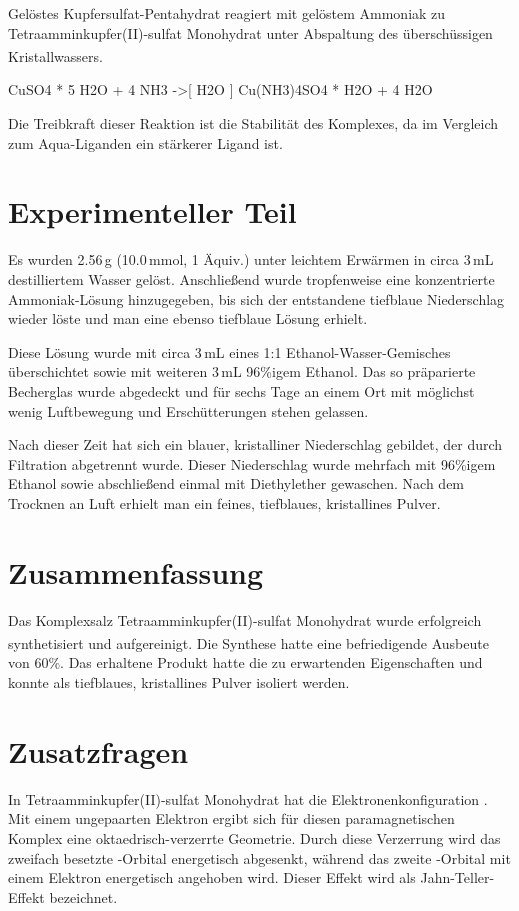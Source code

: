 \documentclass[12pt,a4paper]{scrartcl}
\begin{document}
Gelöstes Kupfersulfat-Pentahydrat  reagiert mit gelöstem Ammoniak  zu
Tetra\-ammin\-kupfer(II)-sulfat Monohydrat unter Abspaltung des überschüssigen Kris\-tall\-wassers.\textsuperscript{\cite{brauer1965handbook}\cite{J/B:2022:tetkupf}}
\begin{reaction}
  CuSO4 * 5 H2O + 4 NH3 ->[ H2O ] \lbrack{}Cu(NH3)4\rbrack{}SO4 * H2O + 4 H2O
\end{reaction}

Die Treibkraft dieser Reaktion ist die Stabilität des Komplexes, da  im Vergleich zum Aqua-Liganden ein
stärkerer Ligand ist.

\section{Experimenteller Teil} %
Es wurden 2.56\,g  (10.0\,mmol, 1 Äquiv.) unter leichtem Erwärmen in circa 3\,mL destilliertem Wasser
gelöst. Anschließend wurde tropfenweise eine konzentrierte Ammoniak-Lösung hinzugegeben, bis sich der entstandene
tiefblaue Niederschlag wieder löste und man eine ebenso tiefblaue Lösung erhielt.

Diese Lösung wurde mit circa 3\,mL eines 1:1 Ethanol-Wasser-Gemisches überschichtet sowie mit weiteren 3\,mL 96\%igem
Ethanol. Das so präparierte Becherglas wurde abgedeckt und für sechs Tage an einem Ort mit möglichst wenig Luftbewegung
und Er\-schüt\-te\-rung\-en stehen gelassen.

Nach dieser Zeit hat sich ein blauer, kristalliner Niederschlag gebildet, der durch Filtration abgetrennt wurde.
Dieser Niederschlag wurde mehrfach mit 96\%igem Ethanol sowie abschließend einmal mit Diethylether gewaschen.
Nach dem Trocknen an Luft erhielt man ein feines, tiefblaues, kristallines Pulver.

\section{Zusammenfassung} %
Das Komplexsalz Tetraamminkupfer(II)-sulfat Monohydrat wurde erfolgreich synthetisiert und aufgereinigt. Die Synthese
hatte eine befriedigende\textsuperscript{\cite{vogel}} Ausbeute von 60\%. Das erhaltene Produkt hatte die zu erwartenden
Eigenschaften und konnte als tiefblaues, kristallines Pulver isoliert werden.

\section{Zusatzfragen} %
In Tetraamminkupfer(II)-sulfat Monohydrat hat  die Elektronenkonfiguration . Mit einem
ungepaarten Elektron ergibt sich für diesen paramagnetischen Komplex eine oktaedrisch-verzerrte Geometrie. Durch diese
Verzerrung wird das zweifach besetzte -Orbital energetisch abgesenkt, während das zweite -Orbital mit
einem Elektron energetisch angehoben wird. Dieser Effekt wird als Jahn-Teller-Effekt bezeichnet.
\end{document}
